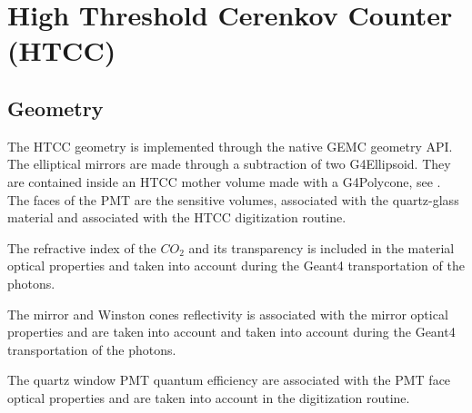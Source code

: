 \section{High Threshold Cerenkov Counter (HTCC)}

\subsection{Geometry}

The HTCC geometry is implemented through the native GEMC geometry API. The elliptical mirrors are made through a subtraction of
two G4Ellipsoid. They are contained inside an HTCC mother volume made with a G4Polycone, see .
The faces of the PMT are the sensitive volumes, associated with the quartz-glass material and associated with the HTCC digitization routine.

The refractive index of the $CO_2$ and its transparency is included in the material optical properties and taken
into account during the Geant4 transportation of the photons.

The mirror and Winston cones reflectivity is associated with the mirror optical properties and are taken into
account and taken into account during the Geant4 transportation of the photons.

The quartz window PMT quantum efficiency are associated with the PMT face optical properties and are taken into account in
the digitization routine.


